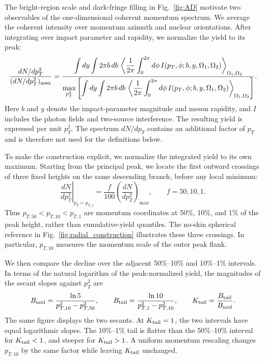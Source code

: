 The bright-region scale and dark-fringe filling in Fig.~\ref{fig:AD}
motivate two observables of the one-dimensional coherent momentum spectrum.
We average the coherent intensity over momentum azimuth and nuclear orientations.
After integrating over impact parameter and rapidity, we normalize the yield to its peak:
\begin{equation}
\frac{dN/dp_T^2}{(dN/dp_T^2)_{\rm max}}
=
\frac{\displaystyle
\int dy\int 2\pi b\,db\,
\left\langle\frac{1}{2\pi}\int_0^{2\pi}d\phi\,
I(p_T,\phi;b,y,\Omega_1,\Omega_2)\right\rangle_{\Omega_1,\Omega_2}
}{\displaystyle
\max_{p_T^2}\left[\int dy\int 2\pi b\,db\,
\left\langle\frac{1}{2\pi}\int_0^{2\pi}d\phi\,
I(p_T,\phi;b,y,\Omega_1,\Omega_2)\right\rangle_{\Omega_1,\Omega_2}\right]}.
\label{eq:radial_spectrum}
\end{equation}
Here $b$ and $y$ denote the impact-parameter magnitude and meson rapidity,
and $I$ includes the photon fields and two-source interference.
The resulting yield is expressed per unit $p_T^2$.
The spectrum $dN/dp_T$ contains an additional factor of $p_T$ and is therefore
not used for the definitions below.

To make the construction explicit, we normalize the integrated yield
to its own maximum.
Starting from the principal peak, we locate the first outward crossings
of three fixed heights on the same descending branch, before any local minimum:
\begin{equation}
\left.\frac{dN}{dp_T^2}\right|_{p_T=p_{T,f}}
=\frac{f}{100}\left(\frac{dN}{dp_T^2}\right)_{\max},
\qquad f=50,10,1.
\label{eq:radial_thresholds}
\end{equation}
Thus $p_{T,50}<p_{T,10}<p_{T,1}$ are momentum coordinates at 50\%, 10\%,
and 1\% of the peak height, rather than cumulative-yield quantiles.
The no-skin spherical reference in Fig.~\ref{fig:radial_construction}
illustrates these three crossings.
In particular, $p_{T,10}$ measures the momentum scale of the outer peak flank.

We then compare the decline over the adjacent 50\%--10\% and
10\%--1\% intervals. In terms of the natural logarithm of the peak-normalized yield,
the magnitudes of the secant slopes against $p_T^2$ are
\begin{equation}
B_{\rm mid}=\frac{\ln 5}{p_{T,10}^2-p_{T,50}^2},\qquad
B_{\rm tail}=\frac{\ln 10}{p_{T,1}^2-p_{T,10}^2},\qquad
K_{\rm tail}=\frac{B_{\rm tail}}{B_{\rm mid}}.
\label{eq:radial_tail_slopes}
\end{equation}
The same figure displays the two secants.
At $K_{\rm tail}=1$, the two intervals have equal logarithmic slopes. The 10\%--1\% tail is flatter than the 50\%--10\% interval for $K_{\rm tail}<1$, and steeper for $K_{\rm tail}>1$. A uniform momentum rescaling changes $p_{T,10}$ by the same factor while leaving $K_{\rm tail}$ unchanged.


